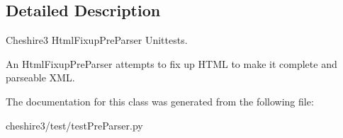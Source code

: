 \subsection{Detailed Description}
\begin{DoxyVerb}Cheshire3 HtmlFixupPreParser Unittests.

An HtmlFixupPreParser attempts to fix up HTML to make it complete and
parseable XML.
\end{DoxyVerb}
 

The documentation for this class was generated from the following file\-:\begin{DoxyCompactItemize}
\item 
cheshire3/test/test\-Pre\-Parser.\-py\end{DoxyCompactItemize}
